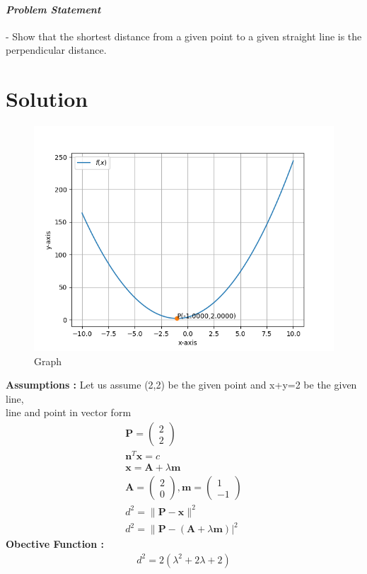 \documentclass[10pt, a4paper]{article}
\title{\mytitle}
\author{\myauthor\hspace{1em}\\\contact\\IITH\hspace{0.5em}-\hspace{0.5em}\mymodule}
\date{}
\newcommand{\myvec}[1]{\ensuremath{\begin{pmatrix}#1\end{pmatrix}}}
\let\vec\mathbf
\begin{document}
	\maketitle
\paragraph{\textit{Problem Statement}}- Show that the shortest distance from a given point to a given straight line is the perpendicular distance.

\section*{\large Solution}
\begin{figure}[H]
\centering
\includegraphics[width=1\columnwidth]{Figure1.png}
\caption{Graph}
\label{fig:triangle}
\end{figure}
\textbf{Assumptions :}
Let us assume (2,2) be the given point and x+y=2 be the given line,\\
line and point in vector form \\
\begin{align}
\vec{P} = \myvec{2\\2}\\
\vec{n}^T\vec{x}=c\\
\vec{x}=\vec{A}+\lambda \vec{m}\\
\vec{A} = \myvec{2\\0}, \vec{m} = \myvec{1\\-1}\\
d^2 = \|\vec{P}-\vec{x}\|^2\\
d^2 = \|\vec{P}-(\vec{A}+\lambda \vec{m})|^2
\end{align}
\textbf{Obective Function :}
\begin{align}
d^2=2(\lambda^2+2\lambda+2)
\end{align}
\end{document}
